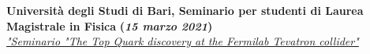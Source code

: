 \documentclass[11pt]{res}
\newcommand{\MarginText}[1]{\section{#1}\vspace{10pt}}
\begin{document}
\begin{resume}



\textbf{Università degli Studi di Bari, Seminario per studenti di Laurea Magistrale in Fisica} \textbf{(\textit{15 marzo 2021})}\\
\href{https://recascloud.ba.infn.it/index.php/s/ItcCFRRq3gKGuXx}{\textit{"Seminario "The Top Quark discovery at the Fermilab Tevatron collider"}} %
											    








\end{resume}
\end{document}

